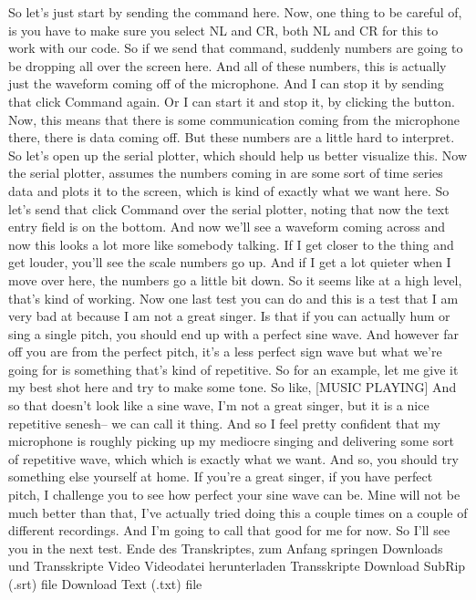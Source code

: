 So let's just start by sending the command here.
Now, one thing to be careful of, is you have
to make sure you select NL and CR, both NL and CR for this
to work with our code.
So if we send that command, suddenly numbers
are going to be dropping all over the screen here.
And all of these numbers, this is actually just the waveform
coming off of the microphone.
And I can stop it by sending that click Command again.
Or I can start it and stop it, by clicking the button.
Now, this means that there is some communication coming
from the microphone there, there is data coming off.
But these numbers are a little hard to interpret.
So let's open up the serial plotter, which
should help us better visualize this.
Now the serial plotter, assumes the numbers coming in
are some sort of time series data and plots it
to the screen, which is kind of exactly what we want here.
So let's send that click Command over the serial plotter,
noting that now the text entry field is on the bottom.
And now we'll see a waveform coming across
and now this looks a lot more like somebody talking.
If I get closer to the thing and get louder,
you'll see the scale numbers go up.
And if I get a lot quieter when I move over here,
the numbers go a little bit down.
So it seems like at a high level, that's kind of working.
Now one last test you can do and this is a test
that I am very bad at because I am not a great singer.
Is that if you can actually hum or sing a single pitch,
you should end up with a perfect sine wave.
And however far off you are from the perfect pitch,
it's a less perfect sign wave but what we're
going for is something that's kind of repetitive.
So for an example, let me give it my best shot here
and try to make some tone.
So like, [MUSIC PLAYING] And so that doesn't look like a sine wave,
I'm not a great singer, but it is a nice repetitive senesh--
we can call it thing.
And so I feel pretty confident that my microphone is roughly
picking up my mediocre singing and delivering
some sort of repetitive wave, which which is exactly what we want.
And so, you should try something else yourself at home.
If you're a great singer, if you have perfect pitch,
I challenge you to see how perfect your sine wave can be.
Mine will not be much better than that, I've
actually tried doing this a couple times on a couple of different recordings.
And I'm going to call that good for me for now.
So I'll see you in the next test.
Ende des Transkriptes, zum Anfang springen
Downloads und Transskripte
Video
Videodatei herunterladen
Transskripte
Download SubRip (.srt) file
Download Text (.txt) file

